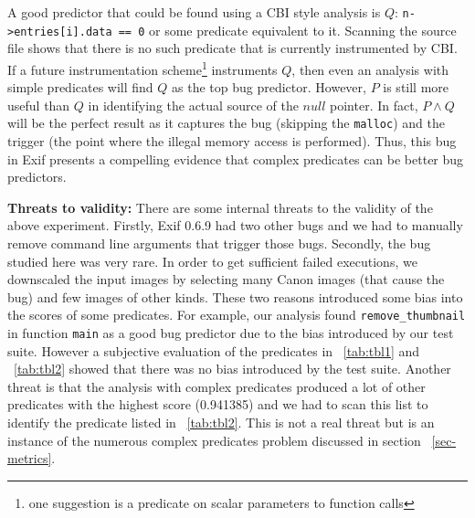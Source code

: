 A good predictor that could be found using a CBI style analysis is $Q$: \texttt{n->entries[i].data == 0} or some predicate equivalent to it.  Scanning the source file shows that there is no such predicate that is currently instrumented by CBI.  If a future instrumentation scheme{\footnote{one suggestion is a predicate on scalar parameters to function calls}} instruments $Q$, then even an analysis with simple predicates will find $Q$ as the top bug predictor.  However, $P$ is still more useful than $Q$ in identifying the actual source of the $null$ pointer.  In fact, $P \wedge Q$ will be the perfect result as it captures the bug (skipping the \texttt{malloc}) and the trigger (the point where the illegal memory access is performed).  Thus, this bug in Exif presents a compelling evidence that complex predicates can be better bug predictors.

\vspace{4pt} \noindent
{\bf Threats to validity:}  There are some internal threats to the validity of the above experiment.  Firstly, Exif 0.6.9 had two other bugs and we had to manually remove command line arguments that trigger those bugs.  Secondly, the bug studied here was very rare.  In order to get sufficient failed executions, we downscaled the input images by selecting many Canon images (that cause the bug) and few images of other kinds.  These two reasons introduced some bias into the scores of some predicates.  For example, our analysis found \texttt{remove\_thumbnail} in function \texttt{main} as a good bug predictor due to the bias introduced by our test suite.  However a subjective evaluation of the predicates in ~\autoref{tab:tbl1} and ~\autoref{tab:tbl2} showed that there was no bias introduced by the test suite.  Another threat is that the analysis with complex predicates produced a lot of other predicates with the highest score (0.941385) and we had to scan this list to identify the predicate listed in ~\autoref{tab:tbl2}.  This is not a real threat but is an instance of the numerous complex predicates problem discussed in section ~\ref{sec-metrics}.